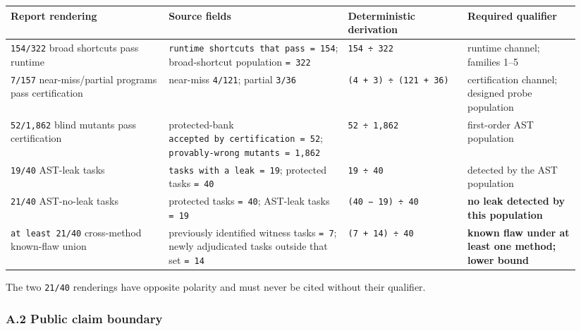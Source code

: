 \documentclass[
  9pt,
  letterpaper,
]{article}
\begin{document}
\begin{longtable}[]{@{}p{0.28\linewidth}p{0.25\linewidth}p{0.21\linewidth}p{0.20\linewidth}@{}}
\toprule\noalign{}
Report rendering & Source fields & Deterministic derivation & Required
qualifier \\
\midrule\noalign{}
\endhead
\bottomrule\noalign{}
\endlastfoot
\texttt{154/322} broad shortcuts pass runtime &
\texttt{runtime\ shortcuts\ that\ pass\ =\ 154}; broad-shortcut
population \texttt{=\ 322} & \texttt{154\ ÷\ 322} & runtime channel;
families 1--5 \\
\texttt{7/157} near-miss/partial programs pass certification & near-miss
\texttt{4/121}; partial \texttt{3/36} &
\texttt{(4\ +\ 3)\ ÷\ (121\ +\ 36)} & certification channel; designed
probe population \\
\texttt{52/1,862} blind mutants pass certification & protected-bank
\texttt{accepted\ by\ certification\ =\ 52};
\texttt{provably-wrong\ mutants\ =\ 1,862} & \texttt{52\ ÷\ 1,862} &
first-order AST population \\
\texttt{19/40} AST-leak tasks & \texttt{tasks\ with\ a\ leak\ =\ 19};
protected tasks \texttt{=\ 40} & \texttt{19\ ÷\ 40} & detected by the
AST population \\
\texttt{21/40} AST-no-leak tasks & protected tasks \texttt{=\ 40};
AST-leak tasks \texttt{=\ 19} & \texttt{(40\ −\ 19)\ ÷\ 40} & \textbf{no
leak detected by this population} \\
\texttt{at\ least\ 21/40} cross-method known-flaw union & previously
identified witness tasks \texttt{=\ 7}; newly adjudicated tasks outside
that set \texttt{=\ 14} & \texttt{(7\ +\ 14)\ ÷\ 40} & \textbf{known
flaw under at least one method; lower bound} \\
\end{longtable}

The two \texttt{21/40} renderings have opposite polarity and must never
be cited without their qualifier.

\hypertarget{a2-public-claim-boundary}{%
\subsubsection{A.2 Public claim
boundary}\label{a2-public-claim-boundary}}
\end{document}
